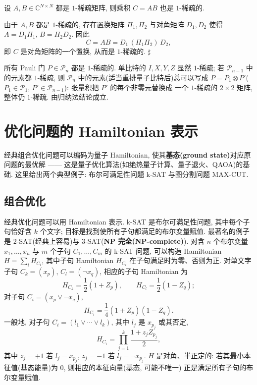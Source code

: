 \documentclass[utf8]{article} %
\numberwithin{equation}{section}   %
\newtheorem{Lem}{\hskip 2em {\color{magenta} 引理}}[subsection]
\newtheorem{Eg}{\hskip 2em {\color{black} 例}}[subsection]
\newenvironment{Proof}{{\noindent\it Proof:}\quad}{\hfill $\sharp $\par}
\begin{document}
\begin{Lem}[1-稀疏矩阵的乘积]
    设 $A, B \in \mathbb{C}^{N\times N}$ 都是 $1$-稀疏矩阵, 则乘积 $C = AB$ 也是 $1$-稀疏的.
\end{Lem}

\begin{Proof}
    由于 $A, B$ 都是 $1$-稀疏的, 存在置换矩阵 $\Pi_1, \Pi_2$ 与对角矩阵 $D_1, D_2$ 使得
    $A = D_1 \Pi_1$, $B = \Pi_2 D_2$. 因此
    \[ C = AB = D_1\, (\Pi_1 \Pi_2)\, D_2, \]
    即 $C$ 是对角矩阵的一个置换, 从而是 $1$-稀疏的.
\end{Proof}

\begin{Eg}
    所有 Pauli 门 $P \in \mathcal{P}_n$ 都是 $1$-稀疏的. 单比特的 $I, X, Y, Z$ 显然 $1$-稀疏;
    若 $\mathcal{P}_{n-1}$ 中的元素都 $1$-稀疏, 则 $\mathcal{P}_n$ 中的元素(适当重排量子比特后)总可以写成
    $P = P_1 \otimes P'$($P_1 \in \mathcal{P}_1$, $P' \in \mathcal{P}_{n-1}$): 张量积把 $P'$ 的每个非零元替换成
    一个 $1$-稀疏的 $2\times 2$ 矩阵, 整体仍 $1$-稀疏. 由归纳法结论成立.
\end{Eg}

\section{优化问题的 Hamiltonian 表示}

经典组合优化问题可以编码为量子 Hamiltonian, 使其\textbf{基态(ground state)}对应原问题的最优解 ——
这是量子优化算法(如绝热量子计算、量子退火、QAOA)的基础. 这里给出两个典型例子:
布尔可满足性问题 k-SAT 与图分割问题 MAX-CUT.

\subsection{组合优化}

\begin{Eg}[k-SAT 问题]
    经典优化问题可以用 Hamiltonian 表示. k-SAT 是布尔可满足性问题, 其中每个子句恰好含 $k$ 个文字;
    目标是找到使所有子句都满足的布尔变量赋值. 最著名的例子是 2-SAT(经典上容易)与 3-SAT(\textbf{NP 完全(NP-complete)}).
    对含 $n$ 个布尔变量 $x_1,\dots,x_n$ 与 $m$ 个子句 $C_1,\dots,C_m$ 的 k-SAT 问题, 可以构造
    Hamiltonian $H = \sum_i H_{C_i}$, 其中子句 Hamiltonian $H_{C_i}$ 在子句满足时为零、否则为正.
    对单文字子句 $C_k = (x_p)$, $C_l = (\neg x_q)$, 相应的子句 Hamiltonian 为
    \[ H_{C_k} = \frac{1}{2}(1 + Z_p), \qquad H_{C_l} = \frac{1}{2}(1 - Z_q); \]
    对子句 $C_i = (x_p \vee \neg x_q)$,
    \[ H_{C_i} = \frac{1}{4}(1 + Z_p)(1 - Z_q). \]
    一般地, 对子句 $C_i = (l_1 \vee \cdots \vee l_k)$, 其中 $l_j$ 是 $x_{p_j}$ 或其否定,
    \[ H_{C_i} = \prod_{j=1}^k \frac{1 + z_j Z_{p_j}}{2}, \]
    其中 $z_j = +1$ 若 $l_j = x_{p_j}$, $z_j = -1$ 若 $l_j = \neg x_{p_j}$.
    $H$ 是对角、半正定的: 若其最小本征值(基态能量)为 $0$, 则相应的本征向量(基态, 可能不唯一)
    正是满足所有子句的布尔变量赋值.
\end{Eg}
\end{document}
